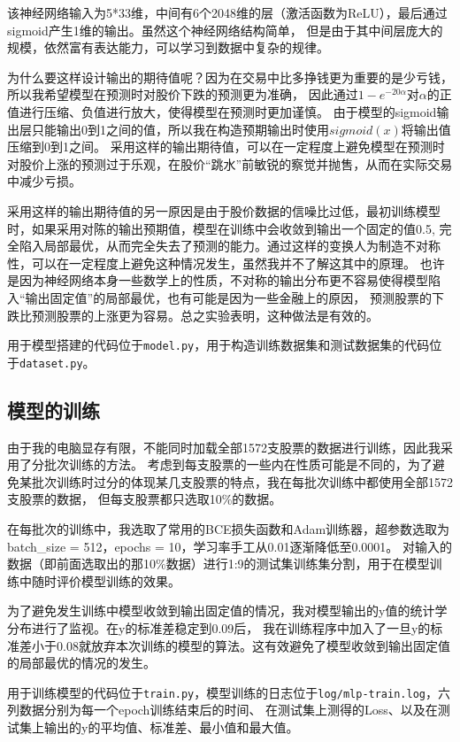 \documentclass[final,5p,times,twocolumn,authoryear]{elsarticle}
\begin{document}
该神经网络输入为5*33维，中间有6个2048维的层（激活函数为ReLU），最后通过sigmoid产生1维的输出。虽然这个神经网络结构简单，
但是由于其中间层庞大的规模，依然富有表达能力，可以学习到数据中复杂的规律。

为什么要这样设计输出的期待值呢？因为在交易中比多挣钱更为重要的是少亏钱，所以我希望模型在预测时对股价下跌的预测更为准确，
因此通过\(1 - e^{-20\alpha}\)对\(\alpha\)的正值进行压缩、负值进行放大，使得模型在预测时更加谨慎。
由于模型的sigmoid输出层只能输出0到1之间的值，所以我在构造预期输出时使用\(sigmoid(x)\)将输出值压缩到0到1之间。
采用这样的输出期待值，可以在一定程度上避免模型在预测时对股价上涨的预测过于乐观，在股价“跳水”前敏锐的察觉并抛售，从而在实际交易中减少亏损。

采用这样的输出期待值的另一原因是由于股价数据的信噪比过低，最初训练模型时，如果采用对陈的输出预期值，模型在训练中会收敛到输出一个固定的值0.5,
完全陷入局部最优，从而完全失去了预测的能力。通过这样的变换人为制造不对称性，可以在一定程度上避免这种情况发生，虽然我并不了解这其中的原理。
也许是因为神经网络本身一些数学上的性质，不对称的输出分布更不容易使得模型陷入“输出固定值”的局部最优，也有可能是因为一些金融上的原因，
预测股票的下跌比预测股票的上涨更为容易。总之实验表明，这种做法是有效的。

用于模型搭建的代码位于\texttt{model.py}，用于构造训练数据集和测试数据集的代码位于\texttt{dataset.py}。

\subsection{模型的训练}
由于我的电脑显存有限，不能同时加载全部1572支股票的数据进行训练，因此我采用了分批次训练的方法。
考虑到每支股票的一些内在性质可能是不同的，为了避免某批次训练时过分的体现某几支股票的特点，我在每批次训练中都使用全部1572支股票的数据，
但每支股票都只选取10\%的数据。

在每批次的训练中，我选取了常用的BCE损失函数和Adam训练器，超参数选取为batch\_size = 512，epochs = 10，学习率手工从0.01逐渐降低至0.0001。
对输入的数据（即前面选取出的那10\%数据）进行1:9的测试集训练集分割，用于在模型训练中随时评价模型训练的效果。

为了避免发生训练中模型收敛到输出固定值的情况，我对模型输出的y值的统计学分布进行了监视。在y的标准差稳定到0.09后，
我在训练程序中加入了一旦y的标准差小于0.08就放弃本次训练的模型的算法。这有效避免了模型收敛到输出固定值的局部最优的情况的发生。

用于训练模型的代码位于\texttt{train.py}，模型训练的日志位于\texttt{log/mlp-train.log}，六列数据分别为每一个epoch训练结束后的时间、
在测试集上测得的Loss、以及在测试集上输出的y的平均值、标准差、最小值和最大值。
\end{document}
